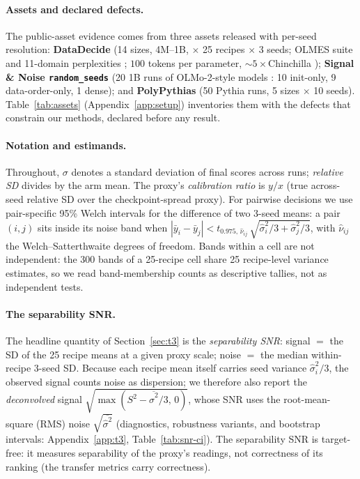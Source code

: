 \paragraph{Assets and declared defects.}
The public-asset evidence comes from three assets released with per-seed resolution:
\textbf{DataDecide} (14 sizes, 4M--1B, $\times$ 25 recipes $\times$ 3 seeds; OLMES suite
\citep{gu2025olmes} and
11-domain perplexities \citep{magnusson2024paloma}; $100$ tokens per parameter, ${\sim}5\times$Chinchilla
\citep{hoffmann2022chinchilla});
\textbf{Signal \& Noise \texttt{random\_seeds}} (20 1B runs of OLMo-2-style models
\citep{olmo2025}: 10 init-only, 9 data-order-only, 1 dense); and \textbf{PolyPythias} (50
Pythia \citep{biderman2023pythia} runs, 5 sizes $\times$ 10 seeds).
Table~\ref{tab:assets} (Appendix~\ref{app:setup}) inventories them with the defects that
constrain our methods, declared before any result.

\paragraph{Notation and estimands.}
\label{sec:setup-notation}
Throughout, $\sigma$ denotes a standard deviation of final scores across runs;
\emph{relative SD} divides by the arm mean. The proxy's \emph{calibration ratio} is
$y/x$ (true across-seed relative SD over the checkpoint-spread proxy). For
pairwise decisions we use pair-specific 95\% Welch
intervals for the difference of two 3-seed means: a pair $(i, j)$ sits inside its noise band
when $|\bar y_i - \bar y_j| < t_{0.975,\,\hat\nu_{ij}}\,\sqrt{\hat\sigma_i^2/3 +
\hat\sigma_j^2/3}$, with $\hat\nu_{ij}$ the Welch--Satterthwaite degrees of freedom. Bands within a cell are not
independent: the 300 bands of a 25-recipe cell share 25 recipe-level variance estimates, so we
read band-membership counts as descriptive tallies, not as independent tests.

\paragraph{The separability SNR.}
The
headline quantity of
Section~\ref{sec:t3} is the \emph{separability SNR}: signal $=$ the SD of the 25 recipe
means at a given proxy scale; noise $=$ the median within-recipe 3-seed SD. Because each
recipe mean itself carries seed variance $\hat\sigma_i^2/3$, the observed signal counts noise
as dispersion; we therefore also report the \emph{deconvolved} signal
$\sqrt{\max(S^2 - \overline{\hat\sigma^2}/3,\,0)}$, whose SNR uses the root-mean-square (RMS) noise
$\sqrt{\overline{\hat\sigma^2}}$ (diagnostics, robustness variants, and bootstrap intervals:
Appendix~\ref{app:t3}, Table~\ref{tab:snr-ci}). The separability SNR is target-free: it measures
separability of the proxy's readings, not correctness of its ranking (the transfer metrics carry
correctness).
